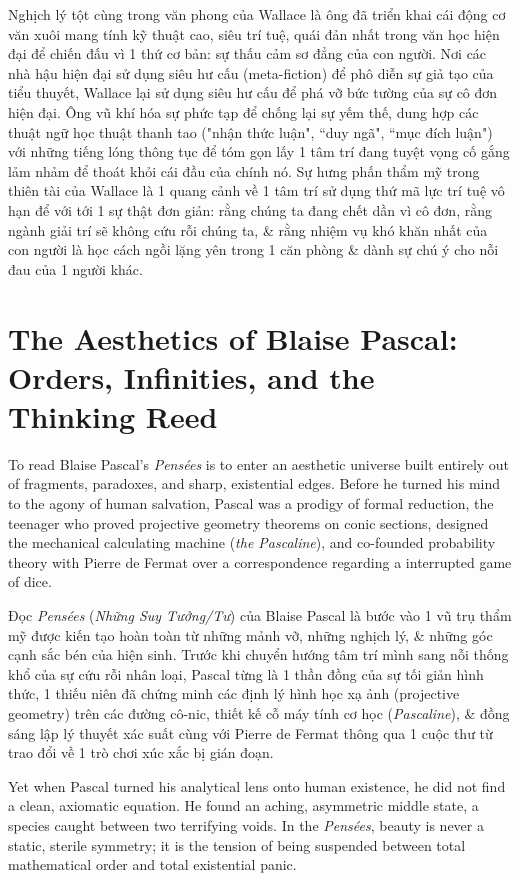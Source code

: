 \documentclass[11pt]{article}
\begin{document}
Nghịch lý tột cùng trong văn phong của Wallace là ông đã triển khai cái động cơ văn xuôi mang tính kỹ thuật cao, siêu trí tuệ, quái đản nhất trong văn học hiện đại để chiến đấu vì 1 thứ cơ bản: sự thấu cảm sơ đẳng của con người. Nơi các nhà hậu hiện đại sử dụng siêu hư cấu (meta-fiction) để phô diễn sự giả tạo của tiểu thuyết, Wallace lại sử dụng siêu hư cấu để phá vỡ bức tường của sự cô đơn hiện đại. Ông vũ khí hóa sự phức tạp để chống lại sự yếm thế, dung hợp các thuật ngữ học thuật thanh tao ("nhận thức luận", ``duy ngã", ``mục đích luận") với những tiếng lóng thông tục để tóm gọn lấy 1 tâm trí đang tuyệt vọng cố gắng lảm nhảm để thoát khỏi cái đầu của chính nó. Sự hưng phấn thẩm mỹ trong thiên tài của Wallace là 1 quang cảnh về 1 tâm trí sử dụng thứ mã lực trí tuệ vô hạn để với tới 1 sự thật đơn giản: rằng chúng ta đang chết dần vì cô đơn, rằng ngành giải trí sẽ không cứu rỗi chúng ta, \& rằng nhiệm vụ khó khăn nhất của con người là học cách ngồi lặng yên trong 1 căn phòng \& dành sự chú ý cho nỗi đau của 1 người khác.

\section{The Aesthetics of Blaise Pascal: Orders, Infinities, and the Thinking Reed}
To read Blaise Pascal's \textit{Pens\'ees} \cite{Pascal_pensees} is to enter an aesthetic universe built entirely out of fragments, paradoxes, and sharp, existential edges. Before he turned his mind to the agony of human salvation, Pascal was a prodigy of formal reduction, the teenager who proved projective geometry theorems on conic sections, designed the mechanical calculating machine (\textit{the Pascaline}), and co-founded probability theory with Pierre de Fermat over a correspondence regarding a interrupted game of dice.

Đọc \textit{Pens\'ees} (\textit{Những Suy Tưởng{\rm/}Tư}) của Blaise Pascal \cite{Pascal_pensees} là bước vào 1 vũ trụ thẩm mỹ được kiến tạo hoàn toàn từ những mảnh vỡ, những nghịch lý, \& những góc cạnh sắc bén của hiện sinh. Trước khi chuyển hướng tâm trí mình sang nỗi thống khổ của sự cứu rỗi nhân loại, Pascal từng là 1 thần đồng của sự tối giản hình thức, 1 thiếu niên đã chứng minh các định lý hình học xạ ảnh (projective geometry) trên các đường cô-nic, thiết kế cỗ máy tính cơ học (\textit{Pascaline}), \& đồng sáng lập lý thuyết xác suất cùng với Pierre de Fermat thông qua 1 cuộc thư từ trao đổi về 1 trò chơi xúc xắc bị gián đoạn.

Yet when Pascal turned his analytical lens onto human existence, he did not find a clean, axiomatic equation. He found an aching, asymmetric middle state, a species caught between two terrifying voids. In the \textit{Pens\'ees}, beauty is never a static, sterile symmetry; it is the tension of being suspended between total mathematical order and total existential panic.
\end{document}
